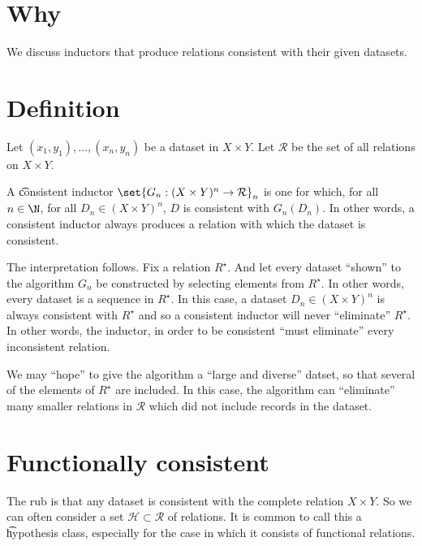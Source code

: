 

\section*{Why}

We discuss inductors that produce relations consistent with their given datasets.

\section*{Definition}

Let $(x_1, y_1), \dots , (x_n, y_n)$ be a dataset in $X \times  Y$.
Let $\mathcal{R} $ be the set of all relations on $X \times Y$.

A \t{consistent inductor} $\set{G_n: (X \times  Y)^n \to \mathcal{R} }_{n}$ is one for which, for all $n \in \N  $, for all $D_n \in (X \times  Y)^n$, $D$ is consistent with $G_n(D_n)$.
In other words, a consistent inductor always produces a relation with which the dataset is consistent.

The interpretation follows.
Fix a relation $R^\star$.
And let every dataset ``shown'' to the algorithm $G_n$ be constructed by selecting elements from $R^{\star}$.
In other words, every dataset is a sequence in $R^\star$.
In this case, a dataset $D_n \in (X \times  Y)^n$ is always consistent with $R^\star$ and so a consistent inductor will never ``eliminate'' $R^{\star}$.
In other words, the inductor, in order to be consistent ``must eliminate'' every inconsistent relation.

We may ``hope'' to give the algorithm a ``large and diverse'' datset, so that several of the elements of $R^\star$ are included.
In this case, the algorithm can ``eliminate'' many smaller relations in $\mathcal{R} $ which did not include records in the dataset.

\section*{Functionally consistent}

The rub is that any dataset is consistent with the complete relation $X \times  Y$.
So we can often consider a set $\mathcal{H}  \subset \mathcal{R} $ of relations.
It is common to call this a \t{hypothesis class}, especially for the case in which it consists of functional relations.
